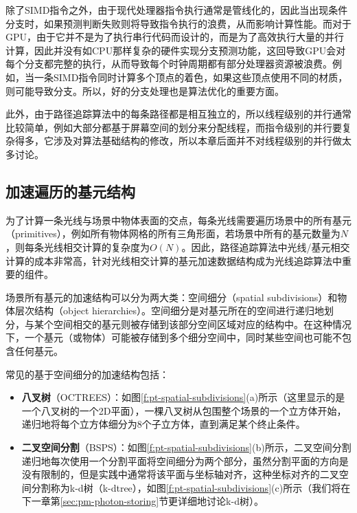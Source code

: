除了SIMD指令之外，由于现代处理器指令执行通常是管线化的，因此当出现条件分支时，如果预测判断失败则将导致指令执行的浪费，从而影响计算性能。而对于GPU，由于它并不是为了执行串行代码而设计的，而是为了高效执行大量的并行计算，因此并没有如CPU那样复杂的硬件实现分支预测功能，这回导致GPU会对每个分支都完整的执行，从而导致每个时钟周期都有部分处理器资源被浪费。例如，当一条SIMD指令同时计算多个顶点的着色，如果这些顶点使用不同的材质，则可能导致分支。所以，好的分支处理也是算法优化的重要方面。

此外，由于路径追踪算法中的每条路径都是相互独立的，所以线程级别的并行通常比较简单，例如大部分都基于屏幕空间的划分来分配线程，而指令级别的并行要复杂得多，它涉及对算法基础结构的修改，所以本章后面并不对线程级别的并行做太多讨论。






\subsection{加速遍历的基元结构}
 为了计算一条光线与场景中物体表面的交点，每条光线需要遍历场景中的所有基元（primitives），例如所有物体网格的所有三角形面，若场景中所有的基元数量为$N$，则每条光线相交计算的复杂度为$O(N)$。因此，路径追踪算法中光线/基元相交计算的成本非常高，针对光线相交计算的基元加速数据结构成为光线追踪算法中重要的组件。

场景所有基元的加速结构可以分为两大类：空间细分（spatial subdivisions）和物体层次结构（object hierarchies）。空间细分是对基元所在的空间进行递归地划分，与某个空间相交的基元则被存储到该部分空间区域对应的结构中。在这种情况下，一个基元（或物体）可能被存储到多个细分空间中，同时某些空间也可能不包含任何基元。

常见的基于空间细分的加速结构包括：

\begin{itemize}
  \item \textbf{八叉树}（OCTREES）：如图\ref{f:pt-spatial-subdivisions}(a)所示（这里显示的是一个八叉树的一个2D平面），一棵八叉树从包围整个场景的一个立方体开始，递归地将每个立方体细分为8个子立方体，直到满足某个终止条件。
  \item \textbf{二叉空间分割}（BSPS）：如图\ref{f:pt-spatial-subdivisions}(b)所示，二叉空间分割递归地每次使用一个分割平面将空间细分为两个部分，虽然分割平面的方向是没有限制的，但是实践中通常将该平面与坐标轴对齐，这种坐标对齐的二叉空间分割称为k-d树（k-dtree），如图\ref{f:pt-spatial-subdivisions}(c)所示（我们将在下一章第\ref{sec:pm-photon-storing}节更详细地讨论k-d树）。
\end{itemize}


